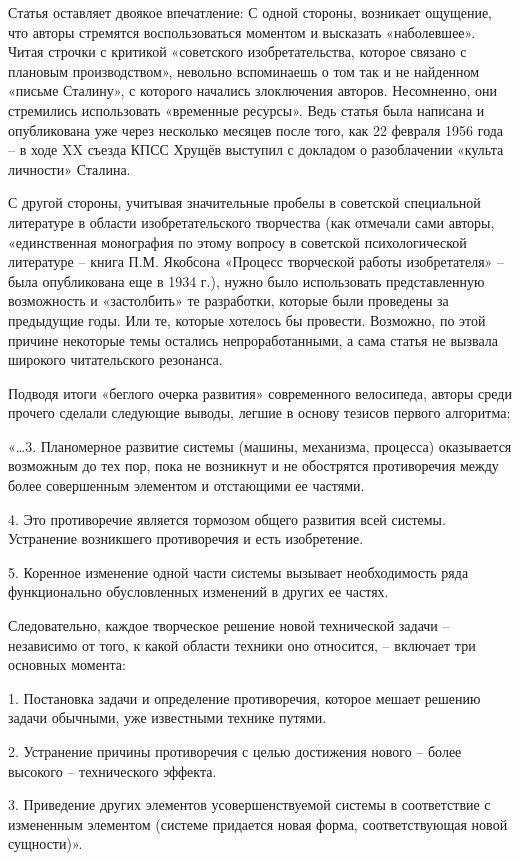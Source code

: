 \documentclass[11pt,a4paper]{article}
\begin{document}
Статья оставляет двоякое впечатление: С одной стороны, возникает ощущение, что
авторы стремятся воспользоваться моментом и высказать «наболевшее». Читая
строчки с критикой «советского изобретательства, которое связано с плановым
производством», невольно вспоминаешь о том так и не найденном «письме
Сталину», с которого начались злоключения авторов. Несомненно, они стремились
использовать «временные ресурсы». Ведь статья была написана и опубликована уже
через несколько месяцев после того, как 22 февраля 1956 года -- в ходе XX
съезда КПСС Хрущёв выступил с докладом о разоблачении «культа личности»
Сталина.

С другой стороны, учитывая значительные пробелы в советской специальной
литературе в области изобретательского творчества (как отмечали сами авторы,
«единственная монография по этому вопросу в советской психологической
литературе -- книга П.М. Якобсона «Процесс творческой работы изобретателя» --
была опубликована еще в 1934 г.), нужно было использовать представленную
возможность и «застолбить» те разработки, которые были проведены за предыдущие
годы. Или те, которые хотелось бы провести. Возможно, по этой причине
некоторые темы остались непроработанными, а сама статья не вызвала широкого
читательского резонанса.

Подводя итоги «беглого очерка развития» современного велосипеда, авторы среди
прочего сделали следующие выводы, легшие в основу тезисов первого алгоритма:

«…3. Планомерное развитие системы (машины, механизма, процесса) оказывается
возможным до тех пор, пока не возникнут и не обострятся противоречия между
более совершенным элементом и отстающими ее частями.

4. Это противоречие является тормозом общего развития всей системы. Устранение
возникшего противоречия и есть изобретение.

5. Коренное изменение одной части системы вызывает необходимость ряда
функционально обусловленных изменений в других ее частях.

Следовательно, каждое творческое решение новой технической задачи --
независимо от того, к какой области техники оно относится, -- включает три
основных момента:

1. Постановка задачи и определение противоречия, которое мешает решению задачи
обычными, уже известными технике путями.

2. Устранение причины противоречия с целью достижения нового -- более высокого
-- технического эффекта.

3. Приведение других элементов усовершенствуемой системы в соответствие с
измененным элементом (системе придается новая форма, соответствующая новой
сущности)».
\end{document}
